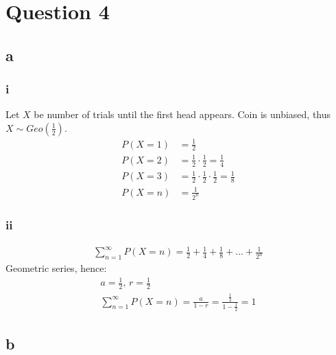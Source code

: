 \documentclass[11pt]{article}
\numberwithin{equation}{section}
\begin{document}
\section{Question 4}
\subsection{a}
\subsubsection{i}
Let $X$ be number of trials until the first head appears. Coin is unbiased, thus $X \sim Geo\left(\frac{1}{2}\right)$.
\begin{align}
    P(X = 1) &= \frac{1}{2}\\
    P(X = 2) &= \frac{1}{2}\cdot\frac{1}{2} = \frac{1}{4}\\
    P(X = 3) &= \frac{1}{2}\cdot\frac{1}{2}\cdot\frac{1}{2} = \frac{1}{8}\\
    P(X = n) &= \frac{1}{2^n}
\end{align}
\subsubsection{ii}
\begin{gather}
    \sum_{n=1}^{\infty} P(X=n) = \frac{1}{2} + \frac{1}{4} + \frac{1}{8} + ... + \frac{1}{2^n}
\end{gather}
Geometric series, hence:
\begin{gather}
    a = \frac{1}{2}, \, r = \frac{1}{2}\\
    \sum_{n=1}^{\infty} P(X=n) = \frac{a}{1-r} = \frac{\frac{1}{2}}{1-\frac{1}{2}} = 1
\end{gather}
\subsection{b}
\end{document}
